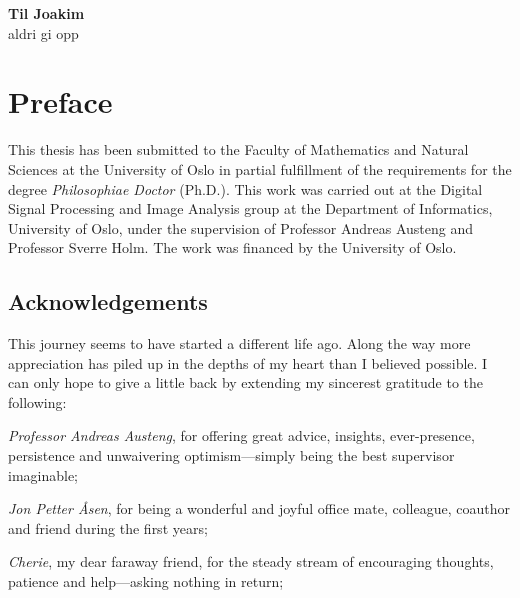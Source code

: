 
\endofdump


\cleardoublepage

\vspace*{\fill}
\begin{center}
{\huge\bf Til Joakim} \\[1.5cm]
{\Large aldri gi opp}
\end{center}
\vspace*{\fill}

\clearpage

\ifRootBuild\else
  
  \makeglossaries
\fi


\pagestyle{normal}



\chapter*{Preface}

This thesis has been submitted to the Faculty of Mathematics and Natural Sciences at the University of Oslo in partial fulfillment of the requirements for the degree \emph{Philosophiae Doctor} (Ph.D.). This work was carried out at the Digital Signal Processing and Image Analysis group at the Department of Informatics, University of Oslo, under the supervision of Professor Andreas Austeng and Professor Sverre Holm. The work was financed by the University of Oslo.

\section*{Acknowledgements}

This journey seems to have started a different life ago. Along the way more appreciation has piled up in the depths of my heart than I believed possible. I can only hope to give a little back by extending my sincerest gratitude to the following:


\emph{Professor Andreas Austeng}, for offering great advice, insights, ever-presence, persistence and unwaivering optimism---simply being the best supervisor imaginable;

\emph{Jon Petter Åsen}, for being a wonderful and joyful office mate, colleague, coauthor and friend during the first years;

\emph{Cherie}, my dear faraway friend, for the steady stream of encouraging thoughts, patience and help---asking nothing in return;

